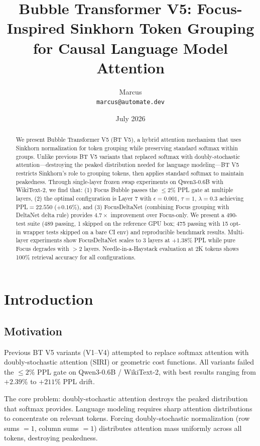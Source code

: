 \documentclass[11pt]{article}
\title{Bubble Transformer V5: Focus-Inspired Sinkhorn Token Grouping for Causal Language Model Attention}
\author{
  Marcus\\
  \texttt{marcus@automate.dev}
}
\date{July 2026}
\begin{document}
\maketitle

\begin{abstract}
We present Bubble Transformer V5 (BT V5), a hybrid attention mechanism that uses Sinkhorn normalization for token grouping while preserving standard softmax within groups. Unlike previous BT V5 variants that replaced softmax with doubly-stochastic attention---destroying the peaked distribution needed for language modeling---BT V5 restricts Sinkhorn's role to grouping tokens, then applies standard softmax to maintain peakedness. Through single-layer frozen swap experiments on Qwen3-0.6B with WikiText-2, we find that: (1) Focus Bubble passes the $\leq 2\%$ PPL gate at multiple layers, (2) the optimal configuration is Layer 7 with $\epsilon=0.001$, $\tau=1$, $\lambda=0.3$ achieving PPL$=22.550$ ($+0.16\%$), and (3) FocusDeltaNet (combining Focus grouping with DeltaNet delta rule) provides $4.7\times$ improvement over Focus-only. We present a 490-test suite (489 passing, 1 skipped on the reference GPU box; 475 passing with 15 opt-in wrapper tests skipped on a bare CI env) and reproducible benchmark results. Multi-layer experiments show FocusDeltaNet scales to 3 layers at $+1.38\%$ PPL while pure Focus degrades with $>2$ layers. Needle-in-a-Haystack evaluation at 2K tokens shows 100\% retrieval accuracy for all configurations.
\end{abstract}

\section{Introduction}

\subsection{Motivation}

Previous BT V5 variants (V1--V4) attempted to replace softmax attention with doubly-stochastic attention (SIRI) or geometric cost functions. All variants failed the $\leq 2\%$ PPL gate on Qwen3-0.6B / WikiText-2, with best results ranging from $+2.39\%$ to $+211\%$ PPL drift.

The core problem: doubly-stochastic attention destroys the peaked distribution that softmax provides. Language modeling requires sharp attention distributions to concentrate on relevant tokens. Forcing doubly-stochastic normalization (row sums $= 1$, column sums $= 1$) distributes attention mass uniformly across all tokens, destroying peakedness.
\end{document}
